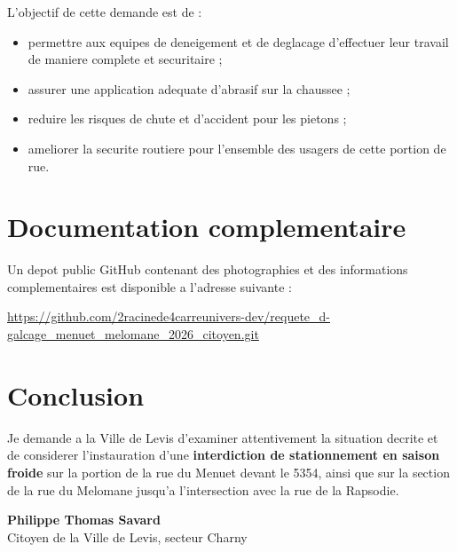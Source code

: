 \documentclass[11pt,a4paper]{article}
\begin{document}
L'objectif de cette demande est de :

\begin{itemize}
  \item permettre aux equipes de deneigement et de deglacage d'effectuer leur travail de maniere complete et securitaire ;
  \item assurer une application adequate d'abrasif sur la chaussee ;
  \item reduire les risques de chute et d'accident pour les pietons ;
  \item ameliorer la securite routiere pour l'ensemble des usagers de cette portion de rue.
\end{itemize}

\section*{Documentation complementaire}

Un depot public GitHub contenant des photographies et des informations complementaires est disponible a l'adresse suivante :

\begin{center}
\url{https://github.com/2racinede4carreunivers-dev/requete_d-galcage_menuet_melomane_2026_citoyen.git}
\end{center}

\section*{Conclusion}

Je demande a la Ville de Levis d'examiner attentivement la situation decrite et de considerer l'instauration d'une \textbf{interdiction de stationnement en saison froide} sur la portion de la rue du Menuet devant le 5354, ainsi que sur la section de la rue du Melomane jusqu'a l'intersection avec la rue de la Rapsodie.

\vspace{1.2cm}

\noindent
\textbf{Philippe Thomas Savard}\\
Citoyen de la Ville de Levis, secteur Charny
\end{document}
